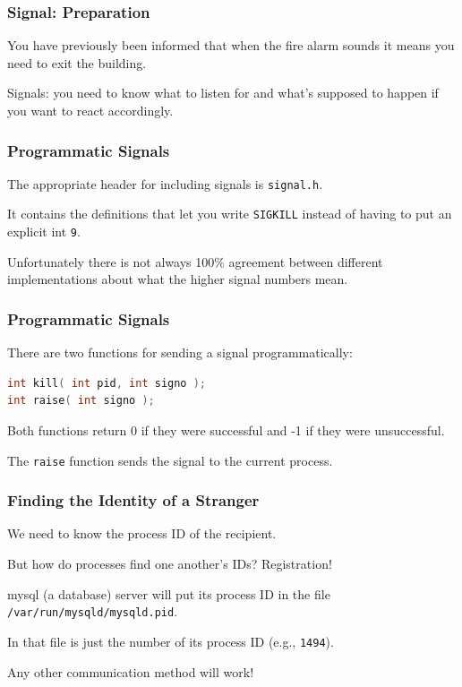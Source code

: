 \begin{frame}
	\frametitle{Signal: Preparation}

	You have previously been informed that when the fire alarm sounds it means you need to exit the building.

	Signals: you need to know what to listen for and what's supposed to happen if you want to react accordingly.

\end{frame}


\begin{frame}
	\frametitle{Programmatic Signals}

	The appropriate header for including signals is \texttt{signal.h}.

	It contains the definitions that let you write \texttt{SIGKILL} instead of having to put an explicit int \texttt{9}.

	Unfortunately there is not always 100\% agreement between different implementations about what the higher signal numbers mean.

\end{frame}


\begin{frame}[fragile]
	\frametitle{Programmatic Signals}

	There are two functions for sending a signal programmatically:

	\begin{lstlisting}[language=C]
int kill( int pid, int signo );
int raise( int signo );
\end{lstlisting}

	Both functions return 0 if they were successful and -1 if they were unsuccessful.

	The \texttt{raise} function sends the signal to the current process.

\end{frame}


\begin{frame}
	\frametitle{Finding the Identity of a Stranger}

	We need to know the process ID of the recipient.

	But how do processes find one another's IDs? Registration!

	mysql (a database) server will put its process ID in the file \texttt{/var/run/mysqld/mysqld.pid}.

	In that file is just the number of its process ID (e.g., \texttt{1494}).

	Any other communication method will work!

\end{frame}


